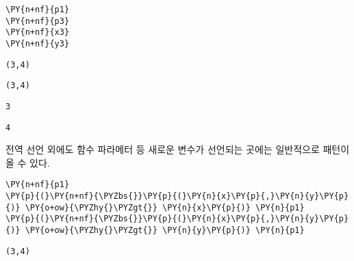     \begin{tcolorbox}[breakable, size=fbox, boxrule=1pt, pad at break*=1mm,colback=cellbackground, colframe=cellborder, top=.75ex]
\begin{Verbatim}[commandchars=\\\{\}]
\PY{n+nf}{p1}
\PY{n+nf}{p3}
\PY{n+nf}{x3}
\PY{n+nf}{y3}
\end{Verbatim}
\end{tcolorbox}

    
    \begin{Verbatim}[commandchars=\\\{\}]
(3,4)
    \end{Verbatim}

    
    
    \begin{Verbatim}[commandchars=\\\{\}]
(3,4)
    \end{Verbatim}

    
    
    \begin{Verbatim}[commandchars=\\\{\}]
3
    \end{Verbatim}

    
    
    \begin{Verbatim}[commandchars=\\\{\}]
4
    \end{Verbatim}

    
    전역 선언 외에도 함수 파라메터 등 새로운 변수가 선언되는 곳에는
일반적으로 패턴이 올 수 있다.

    \begin{tcolorbox}[breakable, size=fbox, boxrule=1pt, pad at break*=1mm,colback=cellbackground, colframe=cellborder, top=.75ex]
\begin{Verbatim}[commandchars=\\\{\}]
\PY{n+nf}{p1}
\PY{p}{(}\PY{n+nf}{\PYZbs{}}\PY{p}{(}\PY{n}{x}\PY{p}{,}\PY{n}{y}\PY{p}{)} \PY{o+ow}{\PYZhy{}\PYZgt{}} \PY{n}{x}\PY{p}{)} \PY{n}{p1}
\PY{p}{(}\PY{n+nf}{\PYZbs{}}\PY{p}{(}\PY{n}{x}\PY{p}{,}\PY{n}{y}\PY{p}{)} \PY{o+ow}{\PYZhy{}\PYZgt{}} \PY{n}{y}\PY{p}{)} \PY{n}{p1}
\end{Verbatim}
\end{tcolorbox}

    
    \begin{Verbatim}[commandchars=\\\{\}]
(3,4)
    \end{Verbatim}

